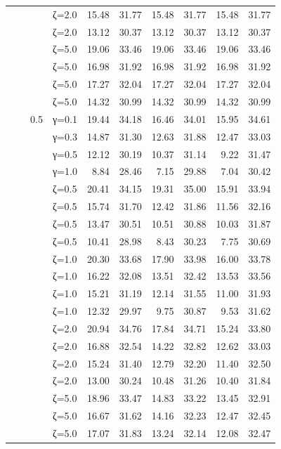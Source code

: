 \begin{table}[htbp]
\begin{tabular}{ll r l  rr  rr  rr}
  &  &  & ζ=2.0 & 15.48 & 31.77 & 15.48 & 31.77 & 15.48 & 31.77 \\
  &  &  & ζ=2.0 & 13.12 & 30.37 & 13.12 & 30.37 & 13.12 & 30.37 \\
  &  &  & ζ=5.0 & 19.06 & 33.46 & 19.06 & 33.46 & 19.06 & 33.46 \\
  &  &  & ζ=5.0 & 16.98 & 31.92 & 16.98 & 31.92 & 16.98 & 31.92 \\
  &  &  & ζ=5.0 & 17.27 & 32.04 & 17.27 & 32.04 & 17.27 & 32.04 \\
  &  &  & ζ=5.0 & 14.32 & 30.99 & 14.32 & 30.99 & 14.32 & 30.99 \\
  &  & 0.5 & γ=0.1 & 19.44 & 34.18 & 16.46 & 34.01 & 15.95 & 34.61 \\
  &  &  & γ=0.3 & 14.87 & 31.30 & 12.63 & 31.88 & 12.47 & 33.03 \\
  &  &  & γ=0.5 & 12.12 & 30.19 & 10.37 & 31.14 & 9.22 & 31.47 \\
  &  &  & γ=1.0 & 8.84 & 28.46 & 7.15 & 29.88 & 7.04 & 30.42 \\
  &  &  & ζ=0.5 & 20.41 & 34.15 & 19.31 & 35.00 & 15.91 & 33.94 \\
  &  &  & ζ=0.5 & 15.74 & 31.70 & 12.42 & 31.86 & 11.56 & 32.16 \\
  &  &  & ζ=0.5 & 13.47 & 30.51 & 10.51 & 30.88 & 10.03 & 31.87 \\
  &  &  & ζ=0.5 & 10.41 & 28.98 & 8.43 & 30.23 & 7.75 & 30.69 \\
  &  &  & ζ=1.0 & 20.30 & 33.68 & 17.90 & 33.98 & 16.00 & 33.78 \\
  &  &  & ζ=1.0 & 16.22 & 32.08 & 13.51 & 32.42 & 13.53 & 33.56 \\
  &  &  & ζ=1.0 & 15.21 & 31.19 & 12.14 & 31.55 & 11.00 & 31.93 \\
  &  &  & ζ=1.0 & 12.32 & 29.97 & 9.75 & 30.87 & 9.53 & 31.62 \\
  &  &  & ζ=2.0 & 20.94 & 34.76 & 17.84 & 34.71 & 15.24 & 33.80 \\
  &  &  & ζ=2.0 & 16.88 & 32.54 & 14.22 & 32.82 & 12.62 & 33.03 \\
  &  &  & ζ=2.0 & 15.24 & 31.40 & 12.79 & 32.20 & 11.40 & 32.50 \\
  &  &  & ζ=2.0 & 13.00 & 30.24 & 10.48 & 31.26 & 10.40 & 31.84 \\
  &  &  & ζ=5.0 & 18.96 & 33.47 & 14.83 & 33.22 & 13.45 & 32.91 \\
  &  &  & ζ=5.0 & 16.67 & 31.62 & 14.16 & 32.23 & 12.47 & 32.45 \\
  &  &  & ζ=5.0 & 17.07 & 31.83 & 13.24 & 32.14 & 12.08 & 32.47 \\

\end{tabular}
\end{table}
